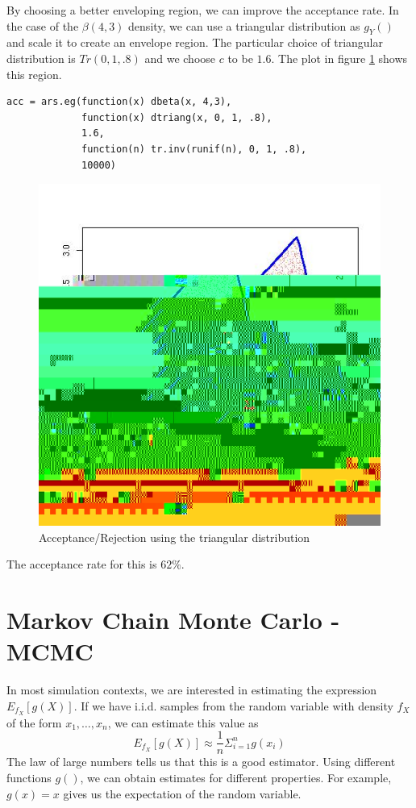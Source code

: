 \documentclass{article}
\begin{document}
By choosing a better enveloping region, we can improve the acceptance
rate.  In the case of the $\beta(4,3)$ density, we can use a
triangular distribution as $g_Y()$ and scale it to create an envelope
region. The particular choice of triangular distribution is $Tr(0, 1,
.8)$ and we choose $c$ to be $1.6$.  The plot in figure
\ref{fig:betaTriang.jpg} shows this region.
\begin{verbatim}
acc = ars.eg(function(x) dbeta(x, 4,3), 
             function(x) dtriang(x, 0, 1, .8), 
             1.6, 
             function(n) tr.inv(runif(n), 0, 1, .8), 
             10000)
\end{verbatim}
\begin{figure}[htbp]
  \begin{center}
    \leavevmode
    \includegraphics{ARSBetaTriangular.jpg}
    \caption{Acceptance/Rejection using the triangular distribution}
    \label{fig:betaTriang.jpg}
  \end{center}
\end{figure}
The acceptance rate for this is $62\%$.


\section{Markov Chain Monte Carlo - MCMC}
In most simulation contexts, we are interested in estimating the
expression $E_{f_X}[g(X)]$.
If we have i.i.d. samples from the random variable with density $f_X$
of the form $x_1, \ldots, x_n$, we can estimate this value
as
\begin{equation}\label{egx}
 E_{f_X}[g(X)] \approx \frac{1}{n} \Sigma_{i=1}^n g(x_i)
\end{equation}
The law of large numbers tells us that this is a good estimator.
Using different functions $g()$, we can obtain estimates for different
properties.  For example, $g(x) = x$ gives us the expectation of the
random variable.
\end{document}
